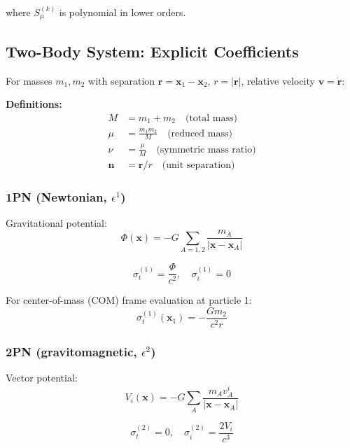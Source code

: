\documentclass[11pt,a4paper]{article}
\theoremstyle{definition}
\theoremstyle{remark}
\begin{document}
	where $S_\mu^{(k)}$ is polynomial in lower orders.
	
	\subsection{Two-Body System: Explicit Coefficients}
	
	For masses $m_1, m_2$ with separation $\mathbf{r} = \mathbf{x}_1 - \mathbf{x}_2$, $r = |\mathbf{r}|$, relative velocity $\mathbf{v} = \dot{\mathbf{r}}$:
	
	\textbf{Definitions:}
	\begin{align}
		M &= m_1 + m_2 \quad \text{(total mass)}\\
		\mu &= \frac{m_1 m_2}{M} \quad \text{(reduced mass)}\\
		\nu &= \frac{\mu}{M} \quad \text{(symmetric mass ratio)}\\
		\mathbf{n} &= \mathbf{r}/r \quad \text{(unit separation)}
	\end{align}
	
	\subsubsection{1PN (Newtonian, $\epsilon^1$)}
	
	Gravitational potential:
	\begin{equation}
		\Phi(\mathbf{x}) = -G\sum_{A=1,2}\frac{m_A}{|\mathbf{x} - \mathbf{x}_A|}
	\end{equation}
	
	\begin{equation}\label{eq:sigma_1pn}
		\boxed{\sigma_t^{(1)} = \frac{\Phi}{c^2}, \quad \sigma_i^{(1)} = 0}
	\end{equation}
	
	For center-of-mass (COM) frame evaluation at particle 1:
	\begin{equation}
		\sigma_t^{(1)}(\mathbf{x}_1) = -\frac{Gm_2}{c^2r}
	\end{equation}
	
	\subsubsection{2PN (gravitomagnetic, $\epsilon^2$)}
	
	Vector potential:
	\begin{equation}
		V_i(\mathbf{x}) = -G\sum_A \frac{m_A v_A^i}{|\mathbf{x} - \mathbf{x}_A|}
	\end{equation}
	
	\begin{equation}\label{eq:sigma_2pn}
		\boxed{\sigma_t^{(2)} = 0, \quad \sigma_i^{(2)} = \frac{2V_i}{c^3}}
	\end{equation}
	
\end{document}
